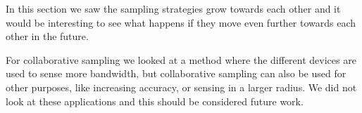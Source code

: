 \documentclass[a4paper, openany, oneside]{memoir}
\begin{document}
In this section we saw the sampling strategies grow towards each other and it would be interesting to see what happens if they move even further towards each other in the future. 

For collaborative sampling we looked at a method where the different devices are used to sense more bandwidth, but collaborative sampling can also be used for other purposes, like increasing accuracy, or sensing in a larger radius. We did not look at these applications and this should be considered future work.
\end{document}

